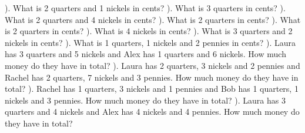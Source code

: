 \documentclass{article}%
\begin{document}
\newline%
\newline%
). What is 2 quarters and 1 nickels in cents?%
\newline%
\newline%
). What is 3 quarters in cents?%
\newline%
\newline%
). What is 2 quarters and 4 nickels in cents?%
\newline%
\newline%
). What is 2 quarters in cents?%
\newline%
\newline%
). What is 2 quarters in cents?%
\newline%
\newline%
). What is 4 nickels in cents?%
\newline%
\newline%
). What is 3 quarters and 2 nickels in cents?%
\newline%
\newline%
). What is 1 quarters, 1 nickels and 2 pennies in cents?%
\newline%
\newline%
). Laura has 3 quarters and 5 nickels and Alex has 1 quarters and 6 nickels. How much money do they have in total?%
\newline%
\newline%
). Laura has 2 quarters, 3 nickels and 2 pennies and Rachel has 2 quarters, 7 nickels and 3 pennies. How much money do they have in total?%
\newline%
\newline%
). Rachel has 1 quarters, 3 nickels and 1 pennies and Bob has 1 quarters, 1 nickels and 3 pennies. How much money do they have in total?%
\newline%
\newline%
). Laura has 3 quarters and 4 nickels and Alex has 4 nickels and 4 pennies. How much money do they have in total?%
\end{document}
